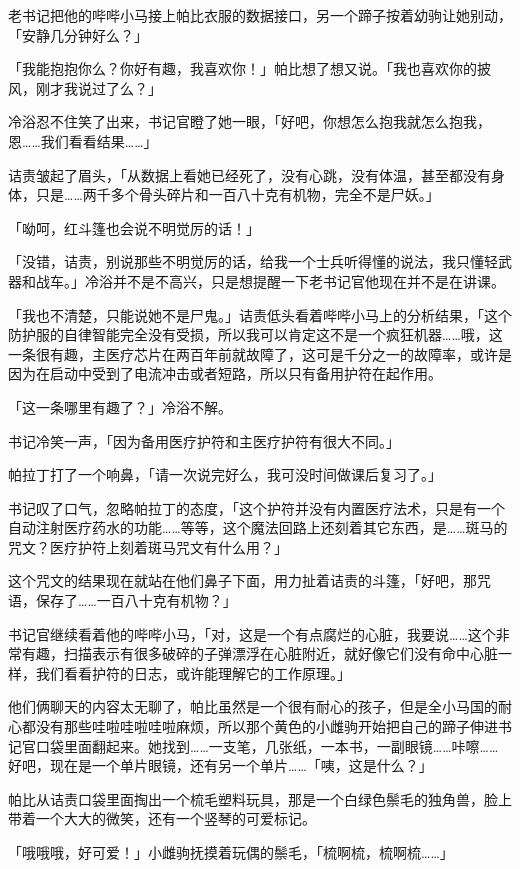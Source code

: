 老书记把他的哔哔小马接上帕比衣服的数据接口，另一个蹄子按着幼驹让她别动，「安静几分钟好么？」

「我能抱抱你么？你好有趣，我喜欢你！」帕比想了想又说。「我也喜欢你的披风，刚才我说过了么？」

冷浴忍不住笑了出来，书记官瞪了她一眼，「好吧，你想怎么抱我就怎么抱我，恩……我们看看结果……」

诘责皱起了眉头，「从数据上看她已经死了，没有心跳，没有体温，甚至都没有身体，只是……两千多个骨头碎片和一百八十克有机物，完全不是尸妖。」

「呦呵，红斗篷也会说不明觉厉的话！」

「没错，诘责，别说那些不明觉厉的话，给我一个士兵听得懂的说法，我只懂轻武器和战车。」冷浴并不是不高兴，只是想提醒一下老书记官他现在并不是在讲课。

「我也不清楚，只能说她不是尸鬼。」诘责低头看着哔哔小马上的分析结果，「这个防护服的自律智能完全没有受损，所以我可以肯定这不是一个疯狂机器……哦，这一条很有趣，主医疗芯片在两百年前就故障了，这可是千分之一的故障率，或许是因为在启动中受到了电流冲击或者短路，所以只有备用护符在起作用。

「这一条哪里有趣了？」冷浴不解。

书记冷笑一声，「因为备用医疗护符和主医疗护符有很大不同。」

帕拉丁打了一个响鼻，「请一次说完好么，我可没时间做课后复习了。」

书记叹了口气，忽略帕拉丁的态度，「这个护符并没有内置医疗法术，只是有一个自动注射医疗药水的功能……等等，这个魔法回路上还刻着其它东西，是……斑马的咒文？医疗护符上刻着斑马咒文有什么用？」

这个咒文的结果现在就站在他们鼻子下面，用力扯着诘责的斗篷，「好吧，那咒语，保存了……一百八十克有机物？」

书记官继续看着他的哔哔小马，「对，这是一个有点腐烂的心脏，我要说……这个非常有趣，扫描表示有很多破碎的子弹漂浮在心脏附近，就好像它们没有命中心脏一样，我们看看护符的日志，或许能理解它的工作原理。」

他们俩聊天的内容太无聊了，帕比虽然是一个很有耐心的孩子，但是全小马国的耐心都没有那些哇啦哇啦哇啦麻烦，所以那个黄色的小雌驹开始把自己的蹄子伸进书记官口袋里面翻起来。她找到……一支笔，几张纸，一本书，一副眼镜……咔嚓……好吧，现在是一个单片眼镜，还有另一个单片……「咦，这是什么？」

帕比从诘责口袋里面掏出一个梳毛塑料玩具，那是一个白绿色鬃毛的独角兽，脸上带着一个大大的微笑，还有一个竖琴的可爱标记。

「哦哦哦，好可爱！」小雌驹抚摸着玩偶的鬃毛，「梳啊梳，梳啊梳……」

